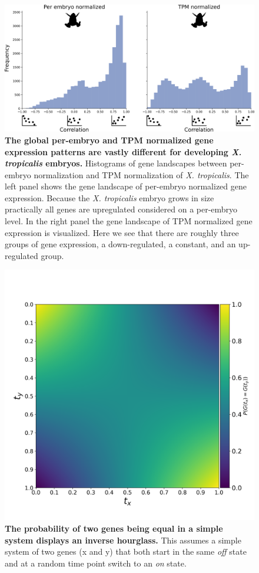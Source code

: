 \begin{figure}[H]
    \includegraphics[width=\linewidth]{ch.hourglass/images/gene_landscape_normalization.png}
    \caption{\textbf{The global per-embryo and TPM normalized gene expression patterns are vastly different for developing \textit{X. tropicalis} embryos.} Histograms of gene landscapes between per-embryo normalization and TPM normalization of \textit{X. tropicalis}. The left panel shows the gene landscape of per-embryo normalized gene expression. Because the \textit{X. tropicalis} embryo grows in size practically all genes are upregulated considered on a per-embryo level. In the right panel the gene landscape of TPM normalized gene expression is visualized. Here we see that there are roughly three groups of gene expression, a down-regulated, a constant, and an up-regulated group.}
    \label{fig:genelandscapenormalization}
\end{figure}

\begin{figure}[H]
    \includegraphics[width=\linewidth]{ch.hourglass/images/math_inverse.png}
    \caption{\textbf{The probability of two genes being equal in a simple system displays an inverse hourglass.} This assumes a simple system of two genes (x and y) that both start in the same \textit{off} state and at a random time point switch to an \textit{on} state. }\label{fig:inverse_math}
\end{figure}

